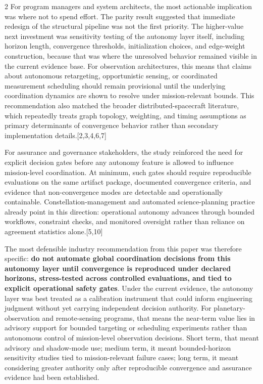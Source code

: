 \documentclass[fleqn,10pt,letterpaper]{article}
\begin{document}
\begin{multicols}{2}
For program managers and system architects, the most actionable implication was where not to spend effort. The parity result suggested that immediate redesign of the structural pipeline was not the first priority. The higher-value next investment was sensitivity testing of the autonomy layer itself, including horizon length, convergence thresholds, initialization choices, and edge-weight construction, because that was where the unresolved behavior remained visible in the current evidence base. For observation architectures, this means that claims about autonomous retargeting, opportunistic sensing, or coordinated measurement scheduling should remain provisional until the underlying coordination dynamics are shown to resolve under mission-relevant bounds. This recommendation also matched the broader distributed-spacecraft literature, which repeatedly treats graph topology, weighting, and timing assumptions as primary determinants of convergence behavior rather than secondary implementation details.[2,3,4,6,7]

For assurance and governance stakeholders, the study reinforced the need for explicit decision gates before any autonomy feature is allowed to influence mission-level coordination. At minimum, such gates should require reproducible evaluations on the same artifact package, documented convergence criteria, and evidence that non-convergence modes are detectable and operationally containable. Constellation-management and automated science-planning practice already point in this direction: operational autonomy advances through bounded workflows, constraint checks, and monitored oversight rather than reliance on agreement statistics alone.[5,10]

The most defensible industry recommendation from this paper was therefore specific: \textbf{do not automate global coordination decisions from this autonomy layer until convergence is reproduced under declared horizons, stress-tested across controlled evaluations, and tied to explicit operational safety gates}. Under the current evidence, the autonomy layer was best treated as a calibration instrument that could inform engineering judgment without yet carrying independent decision authority. For planetary-observation and remote-sensing programs, that means the near-term value lies in advisory support for bounded targeting or scheduling experiments rather than autonomous control of mission-level observation decisions. Short term, that meant advisory and shadow-mode use; medium term, it meant bounded-horizon sensitivity studies tied to mission-relevant failure cases; long term, it meant considering greater authority only after reproducible convergence and assurance evidence had been established.


\end{multicols}
\end{document}
